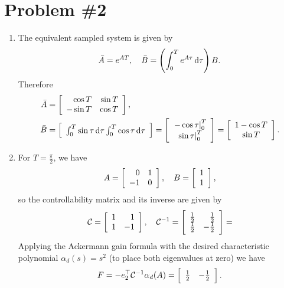 \documentclass{article}
\begin{document}
\pagebreak

\section*{Problem \#2}

\begin{enumerate}
\item{
  The equivalent sampled system is given by
  $$
  \bar{A} = e^{AT}, \quad
  \bar{B} = \left( \int_0^T e^{A \tau} \dif\tau \right) B.
  $$
  Therefore
  \begin{align*}
  \bar{A} &=
  \left[\begin{array}{r r}
    \cos T & \sin T \\
   -\sin T & \cos T
  \end{array}\right], \\
  \bar{B} &=
  \left[\begin{array}{c}
    \int_0^T \sin \tau \dif\tau
    \int_0^T \cos \tau \dif \tau
  \end{array}\right] =
  \left[\begin{array}{c}
    \left. -\cos \tau \right|_0^T \\
    \left. \sin \tau \right|_0^T
  \end{array}\right] =
  \left[\begin{array}{c}
    1 - \cos T \\
    \sin T
  \end{array}\right].
  \end{align*}
}
\item{
  For $T = \frac{\pi}{2}$, we have
  $$
  A =
  \left[\begin{array}{r r}
    0 &  1 \\
   -1 &  0
  \end{array}\right], \quad
  B =
  \left[\begin{array}{r}
    1 \\
    1
  \end{array}\right],
  $$
  so the controllability matrix and its inverse are given by
  $$
  \mathcal{C} =
  \left[\begin{array}{r r}
    1 &  1 \\
    1 & -1
  \end{array}\right], \quad
  \mathcal{C}^{-1} =
  \left[\begin{array}{r r}
    \frac{1}{2} &  \frac{1}{2} \\
    \frac{1}{2} & -\frac{1}{2}
  \end{array}\right] =
  $$
  Applying the Ackermann gain formula with the desired characteristic
  polynomial $\alpha_d(s) = s^2$ (to place both eigenvalues at zero)
  we have
  $$
  F = -e_2^\top \mathcal{C}^{-1} \alpha_d(A) =
  \left[\begin{array}{r r}
    \frac{1}{2} & -\frac{1}{2}
  \end{array}\right].
  $$

}
\end{enumerate}
\end{document}

